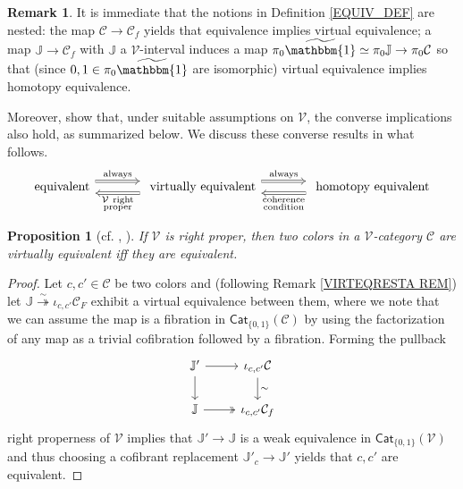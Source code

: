 \documentclass[a4paper,10pt
,draft
]{article}%
\numberwithin{equation}{section}
\numberwithin{figure}{section}
\newtheorem{proposition}[equation]{Proposition}%
\theoremstyle{definition} %
\newtheorem{remark}[equation]{Remark}%
\newcommand{\V}{\ensuremath{\mathcal V}}
\newcommand{\1}{\ensuremath{\mathbbm 1}}%
\begin{document}
\begin{remark}
      \label{EQUIVNEST_REM}
It is immediate that the notions in Definition \ref{EQUIV_DEF}
are nested: the map $\mathcal{C} \to \mathcal{C}_f$
yields that equivalence implies virtual equivalence;
a map $\mathbb{J} \to \mathcal{C}_f$
with $\mathbb{J}$ a $\mathcal{V}$-interval
induces a map
$\pi_0 \widetilde{\mathbbm{1}} \simeq \pi_0 \mathbb{J} \to \pi_0 \mathcal{C}$ so that (since $0,1 \in \pi_0 \widetilde{\mathbbm{1}}$ are isomorphic)
virtual equivalence implies homotopy equivalence.

Moreover, \cite{BM13,Cav} show that, under suitable assumptions on $\V$, the converse implications also hold, as summarized below.
We discuss these converse results in what follows.
\begin{equation}\label{BASCOMP EQ}
\begin{tikzcd}[column sep = large]
            \mbox{equivalent}
            \arrow[r, Rightarrow, shift left=2, "\mathrm{always}"]
            &
            \mbox{ virtually equivalent}
            \arrow[r, Rightarrow, shift left=2, "\mathrm{always}"]
            \arrow[l, Rightarrow, shift left = 2, "\substack{$\V\phantom{ }$\mathrm{right} \\ \mathrm{proper}}"]
            &
            \mbox{ homotopy equivalent}
            \arrow[l, Rightarrow, shift left = 2, "\substack{\mathrm{coherence} \\ \mathrm{condition}}"]
\end{tikzcd}
\end{equation}
\end{remark}



\begin{proposition}[{cf. \cite[4.12]{Cav}, \cite[2.10]{BM13}}] \label{RIGHTPROPER PROP}
If $\V$ is right proper, then two colors in a $\V$-category $\mathcal{C}$ are virtually equivalent iff they are equivalent. 
\end{proposition}


\begin{proof}
Let $c,c'\in \mathcal{C}$ be two colors and (following Remark \ref{VIRTEQRESTA REM})
let $\mathbb{J} \overset{\sim}{\twoheadrightarrow} \iota_{c,c'} \mathcal{C}_F$
exhibit a virtual equivalence between them, where we note
that we can assume the map is a fibration in $\mathsf{Cat}_{\{0,1\}}(\mathcal{C})$
by using the factorization of any map as a trivial cofibration followed by a fibration.
Forming the pullback
\begin{equation}\label{RIGHTPROPER EQ}
\begin{tikzcd}
		 \mathbb{J}' \ar{r} \arrow{d}
	&
		\iota_{c,c'} \mathcal{C} \arrow{d}{\sim}
\\
		\mathbb{J} \ar[twoheadrightarrow]{r} 
	&
		\iota_{c,c'}\mathcal{C}_f
\end{tikzcd}
\end{equation}
right properness of $\V$ implies 
that $\mathbb{J}' \to \mathbb{J}$ is a weak equivalence in 
$\mathsf{Cat}_{\{0,1\}}(\V)$
and thus choosing a cofibrant replacement
$\mathbb{J}'_c \to \mathbb{J}'$
yields that $c,c'$ are equivalent.
\end{proof}
\end{document}
